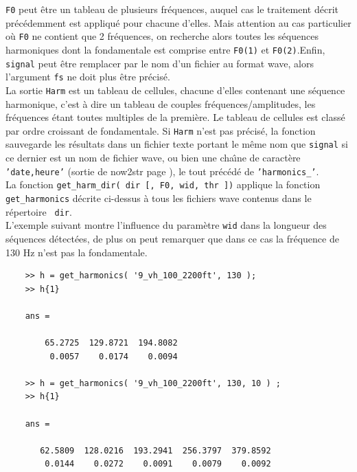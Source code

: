     {\tt F0} peut {\^e}tre un tableau de plusieurs fr{\'e}quences, auquel
    cas le traitement d{\'e}crit pr{\'e}c{\'e}demment est appliqu{\'e} pour
    chacune d'elles. Mais attention au cas particulier o{\`u} {\tt F0}
    ne contient que 2 fr{\'e}quences, on recherche alors
    toutes les s{\'e}quences harmoniques dont la fondamentale est
    comprise entre {\tt F0(1)} et {\tt F0(2)}.Enfin, {\tt signal}
    peut {\^e}tre remplacer par le nom d'un
    fichier au format wave, alors l'argument {\tt fs} ne doit plus
    {\^e}tre pr{\'e}cis{\'e}.\\

    La sortie {\tt Harm} est un tableau de cellules, chacune
    d'elles contenant une s{\'e}quence harmonique, c'est {\`a} dire un
    tableau de couples fr{\'e}quences/amplitudes, les fr{\'e}quences
    {\'e}tant toutes multiples de la premi{\`e}re. Le tableau de cellules
    est class{\'e} par ordre croissant de fondamentale. Si {\tt Harm}
    n'est pas pr{\'e}cis{\'e}, la fonction sauvegarde les r{\'e}sultats dans
    un fichier texte portant le m{\^e}me nom que {\tt signal} si ce
    dernier est un nom de fichier wave, ou bien une cha{\^\i}ne de
    caract{\`e}re {\tt 'date,heure'} (sortie de now2str page
    \pageref{now2str}), le tout pr{\'e}c{\'e}d{\'e} de {\tt 'harmonics\_'}.\\

    La fonction {\tt get\_harm\_dir( dir [, F0, wid, thr ])}
    applique la fonction {\tt get\_harmonics} d{\'e}crite ci-dessus
    {\`a} tous les fichiers wave contenus dans le r{\'e}pertoire {\tt
    dir}.\\

    L'exemple suivant montre l'influence du param{\`e}tre {\tt wid}
    dans la longueur des s{\'e}quences d{\'e}tect{\'e}es, de plus on peut
    remarquer que dans ce cas la fr{\'e}quence de 130 Hz n'est pas la
    fondamentale.

    \label{exgetharmonics}
    \begin{verbatim}
    >> h = get_harmonics( '9_vh_100_2200ft', 130 );
    >> h{1}

    ans =

        65.2725  129.8721  194.8082
         0.0057    0.0174    0.0094

    >> h = get_harmonics( '9_vh_100_2200ft', 130, 10 ) ;
    >> h{1}

    ans =

       62.5809  128.0216  193.2941  256.3797  379.8592
        0.0144    0.0272    0.0091    0.0079    0.0092
    \end{verbatim}

